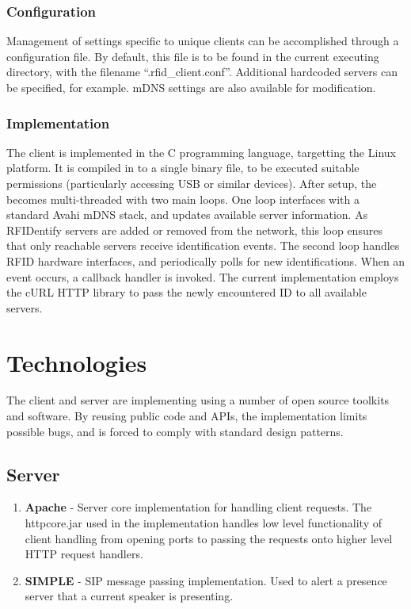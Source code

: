 \documentclass{article}
\begin{document}
	\subsubsection{Configuration}
        Management of settings specific to unique clients can be accomplished through a configuration file.
        By default, this file is to be found in the current executing directory, with the filename ``.rfid\_client.conf''.
        Additional hardcoded servers can be specified, for example. mDNS settings are also available for 
        modification.


        \subsubsection{Implementation}
        The client is implemented in the C programming language, targetting the Linux platform.  It is compiled in to a single 
        binary file, to be executed suitable permissions (particularly accessing USB or similar devices).
        After setup, the becomes multi-threaded with two main loops. One loop interfaces with a standard
        Avahi mDNS stack, and updates available server information.  As RFIDentify servers are added or 
        removed from the network, this loop ensures that only reachable servers receive identification events.
        The second loop handles RFID hardware interfaces, and periodically polls for new identifications.
        When an event occurs, a callback handler is invoked. The current implementation employs the 
        cURL HTTP library to pass the newly encountered ID to all available servers.


\section{Technologies}
	The client and server are implementing using a number of open source toolkits and software.
        By reusing public code and APIs, the implementation limits possible bugs, and is forced to comply
        with standard design patterns.

	\subsection{Server}
	
	\begin{enumerate}
	 \item	\textbf { Apache } -
	   Server core implementation for handling client requests. The httpcore.jar used in the implementation
	   handles low level functionality of client handling from opening ports to passing the requests onto 
           higher level HTTP request handlers.
			
	
	 \item  \textbf {SIMPLE } - 
	   SIP message passing implementation. Used to alert a presence server that a current speaker is presenting.
	\end{enumerate}
\end{document}
